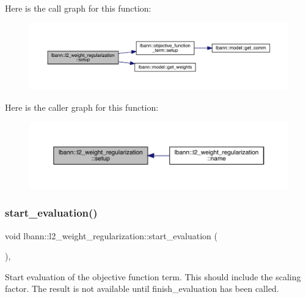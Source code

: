 Here is the call graph for this function\+:\nopagebreak
\begin{figure}[H]
\begin{center}
\leavevmode
\includegraphics[width=350pt]{classlbann_1_1l2__weight__regularization_a0320afab573fbe77b5ba6d22ea5e0898_cgraph}
\end{center}
\end{figure}
Here is the caller graph for this function\+:\nopagebreak
\begin{figure}[H]
\begin{center}
\leavevmode
\includegraphics[width=350pt]{classlbann_1_1l2__weight__regularization_a0320afab573fbe77b5ba6d22ea5e0898_icgraph}
\end{center}
\end{figure}
\mbox{\label{classlbann_1_1l2__weight__regularization_ab3a47d8ef5b8c8e16f076659e864f683}} 
\subsubsection{\texorpdfstring{start\+\_\+evaluation()}{start\_evaluation()}}
{\footnotesize\ttfamily void lbann\+::l2\+\_\+weight\+\_\+regularization\+::start\+\_\+evaluation (\begin{DoxyParamCaption}{ }\end{DoxyParamCaption})\hspace{0.3cm}{\ttfamily [override]}, {\ttfamily [virtual]}}

Start evaluation of the objective function term. This should include the scaling factor. The result is not available until finish\+\_\+evaluation has been called. 

